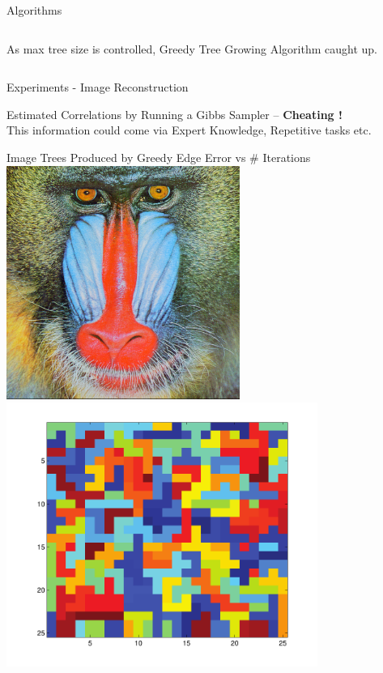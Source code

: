 \documentclass[serif,mathserif,final]{beamer}
\newcommand{\itemlinespace}{0.22in}
\newcommand{\insertlinespace}{\vspace{\itemlinespace}}
\begin{document}
\begin{frame}{}
\begin{columns}[t]
\begin{column}{0.49\linewidth}
\begin{block}{\Huge Algorithms}
\begin{columns}[t]
\begin{column}{0.51\linewidth}
{					As max tree size is controlled,
					Greedy Tree Growing Algorithm caught up.
				}
			\end{column}
		\end{columns}

      \end{block}

      \begin{block}{ \Huge Experiments - Image Reconstruction}
      { \huge
        Estimated Correlations by Running a Gibbs Sampler -- \textbf{Cheating !}
\\
        This information could come via Expert Knowledge, Repetitive tasks etc.
        \insertlinespace
        
        {\Large
        \hspace{2in}
        Image \hspace{2in}
        Trees Produced by Greedy Edge \hspace{1.3in}
        Error vs \# Iterations \\
        }
        \hspace{0.8in}
      	\includegraphics[width=3in]{figs/mandrill.png} \hspace{0.8in}
      	\includegraphics[width=4in]{figs/gridtrees} \hspace{0.8in}
}
\end{block}
\end{column}
\end{columns}
\end{frame}
\end{document}
